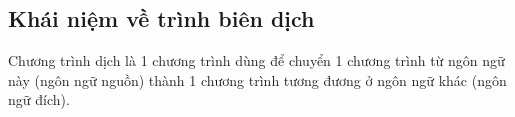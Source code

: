 \subsection{Khái niệm về trình biên dịch}
Chương trình dịch là 1 chương trình dùng để
chuyển 1 chương trình từ ngôn ngữ này (ngôn ngữ nguồn) thành 1 chương
trình tương đương ở ngôn ngữ khác (ngôn ngữ đích).
